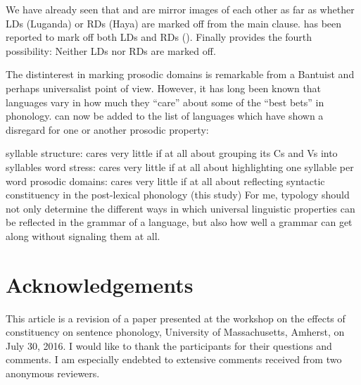 \documentclass[output=paper]{langsci/langscibook}
\begin{document}
We have already seen that  and  are mirror images of each other as
far as whether \glspl{LD} (Luganda) or \glspl{RD} (Haya) are marked off from
the main clause.   has been reported to mark off both \glspl{LD} and
RDs (\citealt[1966--1967]{DowningMtenje2011}). Finally  provides the fourth
possibility: Neither \glspl{LD} nor \glspl{RD} are marked off.

The  distinterest in marking prosodic domains is
remarkable from a Bantuist and perhaps universalist point of view. However, it
has long been known that languages vary in how much they “care” about some of
the “best bets” in phonology.  can now be added to the list of languages
which have shown a disregard for one or another prosodic property:

\ea\label{ex:key:13.47}
    \ea syllable structure:  cares very little if at all about grouping its Cs and Vs into syllables \citep{Hyman2011}
    \ex word stress:  cares very little if at all about highlighting one syllable per word \citep[132]{Newman1947}
    \ex prosodic domains:   cares very little if at all about reflecting syntactic constituency in the post-lexical phonology (this study)
    \z
\z
For me, typology should not only determine the different ways in which
universal linguistic properties can be reflected in the grammar of a language,
but also how well a grammar can get along without signaling them at all.



\printchapterglossary{}

\section*{Acknowledgements}

This article is a revision of a paper presented at the workshop on the effects
of constituency on sentence phonology, University of Massachusetts, Amherst, on
July 30, 2016. I would like to thank the participants for their questions and
comments. I am especially endebted to extensive comments received from two
anonymous reviewers.

{\sloppy
\printbibliography[heading=subbibliography,notkeyword=this]
}
\end{document}
